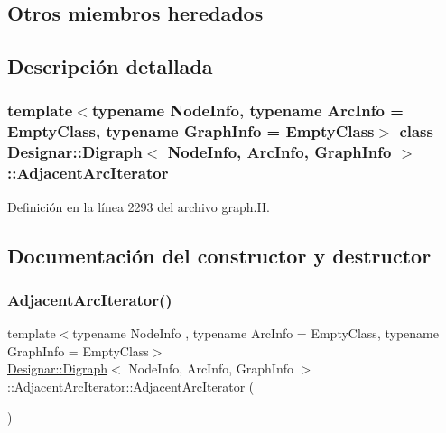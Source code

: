 \subsection*{Otros miembros heredados}


\subsection{Descripción detallada}
\subsubsection*{template$<$typename Node\+Info, typename Arc\+Info = Empty\+Class, typename Graph\+Info = Empty\+Class$>$\newline
class Designar\+::\+Digraph$<$ Node\+Info, Arc\+Info, Graph\+Info $>$\+::\+Adjacent\+Arc\+Iterator}



Definición en la línea 2293 del archivo graph.\+H.



\subsection{Documentación del constructor y destructor}
\mbox{\label{class_designar_1_1_digraph_1_1_adjacent_arc_iterator_a44c04d22e04c7458517a41bced9338f6}} 
\subsubsection{\texorpdfstring{Adjacent\+Arc\+Iterator()}{AdjacentArcIterator()}\hspace{0.1cm}{\footnotesize\ttfamily [1/5]}}
{\footnotesize\ttfamily template$<$typename Node\+Info , typename Arc\+Info  = Empty\+Class, typename Graph\+Info  = Empty\+Class$>$ \\
\hyperlink{class_designar_1_1_digraph}{Designar\+::\+Digraph}$<$ Node\+Info, Arc\+Info, Graph\+Info $>$\+::Adjacent\+Arc\+Iterator\+::\+Adjacent\+Arc\+Iterator (\begin{DoxyParamCaption}{ }\end{DoxyParamCaption})\hspace{0.3cm}{\ttfamily [inline]}}



